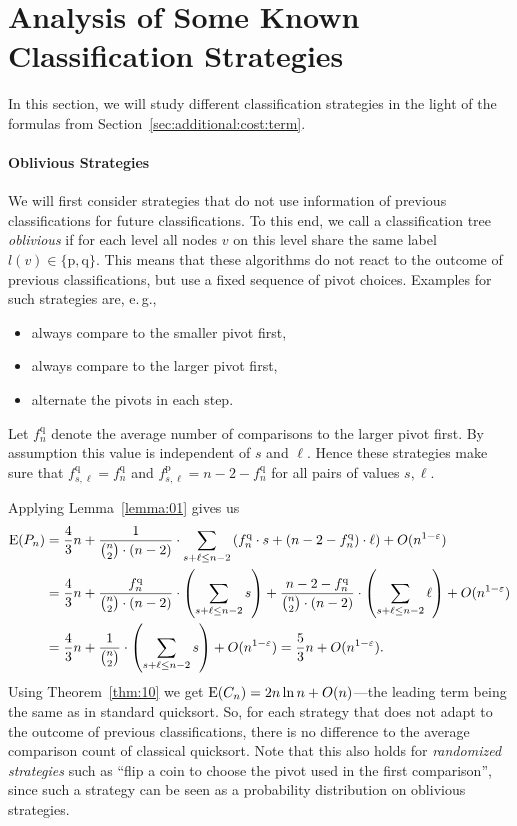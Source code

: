 \documentclass[prodmode,acmtalg]{acmsmall}
\newcommand{\E}{\textnormal{\textrm{E}}}
\begin{document}
\section{Analysis of Some Known Classification Strategies}\label{sec:methods}
In this section, we will study different classification strategies in the light
of the formulas from
Section~\ref{sec:additional:cost:term}.  

\paragraph{Oblivious Strategies}
We will first consider strategies that do not use information of previous
classifications for future classifications. To this end, we call a classification tree
\emph{oblivious} if for each level all nodes $v$ on this level share the same
label $l(v) \in \{\text{p},\text{q}\}$. 
This means that
these algorithms do not react
to the outcome of previous classifications, but use a fixed sequence of pivot
choices.
Examples for
such strategies are, e.\,g., 
\begin{itemize}
    \item always compare to the smaller pivot first, 
    \item always
compare to the larger pivot first,
    \item alternate the pivots in each step.
\end{itemize}
Let $f^\text{q}_n$ denote the average number of comparisons to the larger pivot
first. By assumption this value is independent of $s$ and $\ell$. Hence these
strategies make sure that $f^\text{q}_{s,\ell} = f^\text{q}_n$ and
$f^\text{p}_{s,\ell} = n - 2 - f^\text{q}_n$ for all pairs of values $s, \ell$.

Applying Lemma~\ref{lemma:01} gives us 
\begin{align*}
    \E(P_n) &=
    \frac{4}{3}n + \frac{1}{\binom{n}{2} \cdot (n - 2)} \cdot \sum_{s + \ell
    \leq n - 2} \left(f^\text{q}_n \cdot s + (n - 2 - f^\text{q}_n) \cdot \ell\right) + O(n^{1 - \varepsilon})\\
    &= \frac43n + \frac{f^\text{q}_n}{\binom{n}{2} \cdot (n - 2)} \cdot \left(\sum_{s + \ell \leq n - 2} s \right)+ 
    \frac{n - 2- f^\text{q}_n}{\binom{n}{2} \cdot (n - 2)} \cdot \left(\sum_{s + \ell \leq n - 2} \ell \right) + O(n^{1 - \varepsilon})\\
    &= \frac43n + \frac{1}{\binom{n}{2}} \cdot \left(\sum_{s + \ell \leq n - 2} s \right) + O(n^{1 - \varepsilon}) = \frac53n + O(n^{1 - \varepsilon}).
\end{align*}
Using Theorem~\ref{thm:10} we get $\E(C_n) = 2  n \ln n +
O(n)$---the leading term being the same as in standard quicksort. 
So, for each strategy that does not adapt to the outcome of previous
classifications, there is no difference to the average
comparison count of classical quicksort. Note that this also holds for
\emph{randomized strategies} such as ``flip a coin to choose the pivot used in the
first comparison'', since such a strategy can be seen as a probability
distribution on oblivious strategies.
\end{document}
